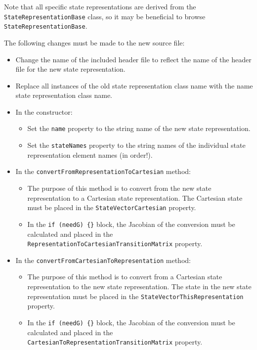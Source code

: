 \documentclass[11pt]{article}
\begin{document}
\noindent Note that all specific state representations are derived from the \texttt{StateRepresentationBase} class, so it may be beneficial to browse \texttt{StateRepresentationBase}.

The following changes must be made to the new source file:

\begin{itemize}
	\item Change the name of the included header file to reflect the name of the header file for the new state representation.
	\item Replace all instances of the old state representation class name with the name state representation class name.
	\item In the constructor:
	\begin{itemize}
		\item Set the \texttt{name} property to the string name of the new state representation.
		\item Set the \texttt{stateNames} property to the string names of the individual state representation element names (in order!).
	\end{itemize}
\item In the \texttt{convertFromRepresentationToCartesian} method:
	\begin{itemize}
		\item The purpose of this method is to convert from the new state representation to a Cartesian state representation. The Cartesian state must be placed in the \texttt{StateVectorCartesian} property.
		\item In the \texttt{if (needG) \{\}} block, the Jacobian of the conversion must be calculated and placed in the \texttt{RepresentationToCartesianTransitionMatrix} property.
	\end{itemize}
\item In the \texttt{convertFromCartesianToRepresentation} method:
	\begin{itemize}
		\item The purpose of this method is to convert from a Cartesian state representation to the new state representation. The state in the new state representation must be placed in the \texttt{StateVectorThisRepresentation} property.
		\item In the \texttt{if (needG) \{\}} block, the Jacobian of the conversion must be calculated and placed in the \texttt{CartesianToRepresentationTransitionMatrix} property.
	\end{itemize}
\end{itemize}
\end{document}
